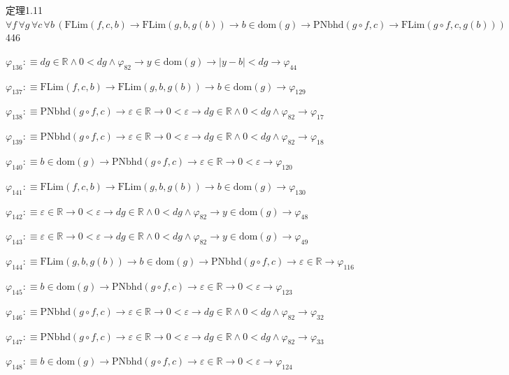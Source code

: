 \begin{fullproof}{定理1.11}{$\forall f\,\forall g\,\forall c\,\forall b\,(\mathrm{FLim}(f,c,b) \to \mathrm{FLim}(g,b,g(b)) \to b \in \mathrm{dom}(g) \to \mathrm{PNbhd}(g \circ f,c) \to \mathrm{FLim}(g \circ f,c,g(b)))$}{446}
\begin{abbrevlist}
\item $\varphi_{136} :\equiv \mathit{dg} \in \mathbb{R} \land 0 < \mathit{dg} \land \varphi_{82} \to y \in \mathrm{dom}(g) \to \lvert y - b \rvert < \mathit{dg} \to \varphi_{44}$
\item $\varphi_{137} :\equiv \mathrm{FLim}(f,c,b) \to \mathrm{FLim}(g,b,g(b)) \to b \in \mathrm{dom}(g) \to \varphi_{129}$
\item $\varphi_{138} :\equiv \mathrm{PNbhd}(g \circ f,c) \to \varepsilon \in \mathbb{R} \to 0 < \varepsilon \to \mathit{dg} \in \mathbb{R} \land 0 < \mathit{dg} \land \varphi_{82} \to \varphi_{17}$
\item $\varphi_{139} :\equiv \mathrm{PNbhd}(g \circ f,c) \to \varepsilon \in \mathbb{R} \to 0 < \varepsilon \to \mathit{dg} \in \mathbb{R} \land 0 < \mathit{dg} \land \varphi_{82} \to \varphi_{18}$
\item $\varphi_{140} :\equiv b \in \mathrm{dom}(g) \to \mathrm{PNbhd}(g \circ f,c) \to \varepsilon \in \mathbb{R} \to 0 < \varepsilon \to \varphi_{120}$
\item $\varphi_{141} :\equiv \mathrm{FLim}(f,c,b) \to \mathrm{FLim}(g,b,g(b)) \to b \in \mathrm{dom}(g) \to \varphi_{130}$
\item $\varphi_{142} :\equiv \varepsilon \in \mathbb{R} \to 0 < \varepsilon \to \mathit{dg} \in \mathbb{R} \land 0 < \mathit{dg} \land \varphi_{82} \to y \in \mathrm{dom}(g) \to \varphi_{48}$
\item $\varphi_{143} :\equiv \varepsilon \in \mathbb{R} \to 0 < \varepsilon \to \mathit{dg} \in \mathbb{R} \land 0 < \mathit{dg} \land \varphi_{82} \to y \in \mathrm{dom}(g) \to \varphi_{49}$
\item $\varphi_{144} :\equiv \mathrm{FLim}(g,b,g(b)) \to b \in \mathrm{dom}(g) \to \mathrm{PNbhd}(g \circ f,c) \to \varepsilon \in \mathbb{R} \to \varphi_{116}$
\item $\varphi_{145} :\equiv b \in \mathrm{dom}(g) \to \mathrm{PNbhd}(g \circ f,c) \to \varepsilon \in \mathbb{R} \to 0 < \varepsilon \to \varphi_{123}$
\item $\varphi_{146} :\equiv \mathrm{PNbhd}(g \circ f,c) \to \varepsilon \in \mathbb{R} \to 0 < \varepsilon \to \mathit{dg} \in \mathbb{R} \land 0 < \mathit{dg} \land \varphi_{82} \to \varphi_{32}$
\item $\varphi_{147} :\equiv \mathrm{PNbhd}(g \circ f,c) \to \varepsilon \in \mathbb{R} \to 0 < \varepsilon \to \mathit{dg} \in \mathbb{R} \land 0 < \mathit{dg} \land \varphi_{82} \to \varphi_{33}$
\item $\varphi_{148} :\equiv b \in \mathrm{dom}(g) \to \mathrm{PNbhd}(g \circ f,c) \to \varepsilon \in \mathbb{R} \to 0 < \varepsilon \to \varphi_{124}$

\end{abbrevlist}
\end{fullproof}
